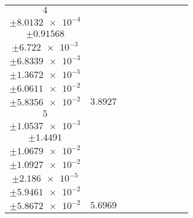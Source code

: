 \documentclass[8pt]{article}
\begin{document}
\begin{longtable}[l]{c c c c c c c c c}
$\num{4}$ & \begin{tabular}[c]{@{}c@{}}$\num{3.0288e-2}$ \\ $\pm\num{8.0132e-4}$\end{tabular} & \begin{tabular}[c]{@{}c@{}}$\num{0.18067}$ \\ $\pm\num{0.91568}$\end{tabular} & \begin{tabular}[c]{@{}c@{}}$\num{-3.7122}$ \\ $\pm\num{6.722e-3}$\end{tabular} & \begin{tabular}[c]{@{}c@{}}$\num{1.5708e+3}$ \\ $\pm\num{6.8339e-3}$\end{tabular} & \begin{tabular}[c]{@{}c@{}}$\num{3.1425}$ \\ $\pm\num{1.3672e-5}$\end{tabular} & \begin{tabular}[c]{@{}c@{}}$\num{4.2939}$ \\ $\pm\num{6.0611e-2}$\end{tabular} & \begin{tabular}[c]{@{}c@{}}$\num{4.2272}$ \\ $\pm\num{5.8356e-2}$\end{tabular} & $\num{3.8927}$\\
$\num{5}$ & \begin{tabular}[c]{@{}c@{}}$\num{4.7198e-2}$ \\ $\pm\num{1.0537e-3}$\end{tabular} & \begin{tabular}[c]{@{}c@{}}$\num{0.50877}$ \\ $\pm\num{1.4491}$\end{tabular} & \begin{tabular}[c]{@{}c@{}}$\num{-1.7408}$ \\ $\pm\num{1.0679e-2}$\end{tabular} & \begin{tabular}[c]{@{}c@{}}$\num{1.5728e+3}$ \\ $\pm\num{1.0927e-2}$\end{tabular} & \begin{tabular}[c]{@{}c@{}}$\num{3.1464}$ \\ $\pm\num{2.186e-5}$\end{tabular} & \begin{tabular}[c]{@{}c@{}}$\num{5.2113}$ \\ $\pm\num{5.9461e-2}$\end{tabular} & \begin{tabular}[c]{@{}c@{}}$\num{5.3678}$ \\ $\pm\num{5.8672e-2}$\end{tabular} & $\num{5.6969}$\\

\end{longtable}
\end{document}
